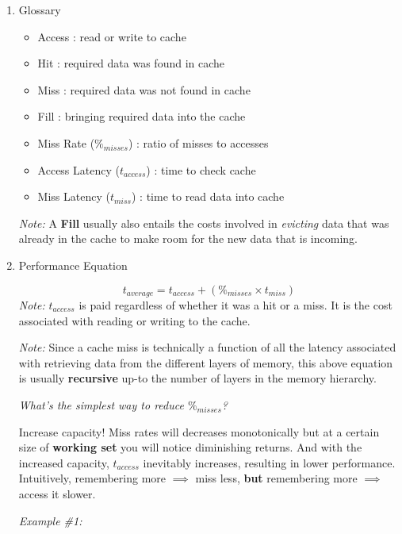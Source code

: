 \documentclass[12pt]{article}
\newenvironment{QandA}{\begin{enumerate}[label=\bfseries\arabic*.]\bfseries}
                      {\end{enumerate}}
\newenvironment{answered}{\par\quad\normalfont}{}
\begin{document}
\begin{QandA}
\item Glossary
\begin{answered}
\vspace{-0.85cm}
\begin{itemize}
    \item Access : read or write to cache
    \item Hit : required data was found in cache
    \item Miss : required data was not found in cache
    \item Fill : bringing required data into the cache
    \item Miss Rate ($\%_{misses}$) : ratio of misses to accesses
    \item Access Latency ($t_{access}$) : time to check cache
    \item Miss Latency ($t_{miss}$) : time to read data into cache
\end{itemize}
\textit{Note:} A \textbf{Fill} usually also entails the costs involved in \textit{evicting} data that was already in the cache to make room for the new data that is incoming. 
\end{answered}

\item Performance Equation
\begin{answered}
\vspace{-0.45cm}
\begin{equation}
    t_{average} = t_{access} + (\%_{misses} \times t_{miss})
\end{equation}
\textit{Note:} $t_{access}$ is paid regardless of whether it was a hit or a miss. It is the cost associated with reading or writing to the cache.

\textit{Note:} Since a cache miss is technically a function of all the latency associated with retrieving data from the different layers of memory, this above equation is usually \textbf{recursive} up-to the number of layers in the memory hierarchy.

\textit{What's the simplest way to reduce $\%_{misses}$?}

\quad Increase capacity! Miss rates will decreases monotonically but at a certain size of \textbf{working set} you will notice diminishing returns. And with the increased capacity, $t_{access}$ inevitably increases, resulting in lower performance. Intuitively, remembering more $\implies$ miss less, \textbf{but} remembering more $\implies$ access it slower.

\textit{Example \#1:} 


\end{answered}
\end{QandA}
\end{document}
